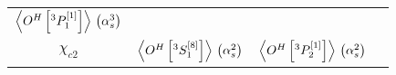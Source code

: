{\begin{tabular}{cccc}
	$\expval{ O^H\left[^3P_1^{\left[1\right]}\right]}\, \left(\alpha_s^3\right)$                                                                                                     \\
	$\chi_{c2}$                                                                                                                                                                    &
	$\expval{ O^H\left[^3S_1^{\left[8\right]}\right]}\, \left(\alpha_s^2\right)$                                                                                                   &
	$\expval{ O^H\left[^3P_2^{\left[1\right]}\right]}\, \left(\alpha_s^2\right)$                                                                                                   &
	\\ \hline
\end{tabular}
}